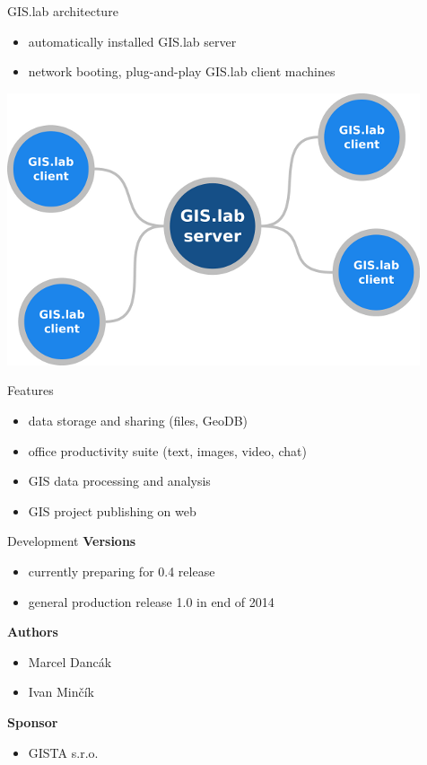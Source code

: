 \documentclass[12pt]{beamer}
\begin{document}
\begin{frame}{GIS.lab architecture}
	\begin{itemize}
		\item automatically installed GIS.lab server
		\item network booting, plug-and-play GIS.lab client machines
	\end{itemize}
	\begin{center}
		\includegraphics[keepaspectratio=true,height=0.6\textheight]{images/gislab-architecture.png}
	\end{center}
\end{frame}


\begin{frame}{Features}
	\begin{itemize}[<+->]
		\item data storage and sharing (files, GeoDB)
		\item office productivity suite (text, images, video, chat)
		\item GIS data processing and analysis
		\item GIS project publishing on web
	\end{itemize}
\end{frame}


\begin{frame}{Development}
	\textbf{Versions}
	\begin{itemize}
		\item currently preparing for 0.4 release
		\item general production release 1.0 in end of 2014
	\end{itemize}

	\textbf{Authors}
	\begin{itemize}
		\item Marcel Dancák
		\item Ivan Minčík
	\end{itemize}

	\textbf{Sponsor}
	\begin{itemize}
		\item GISTA s.r.o.
	\end{itemize}
\end{frame}
\end{document}

